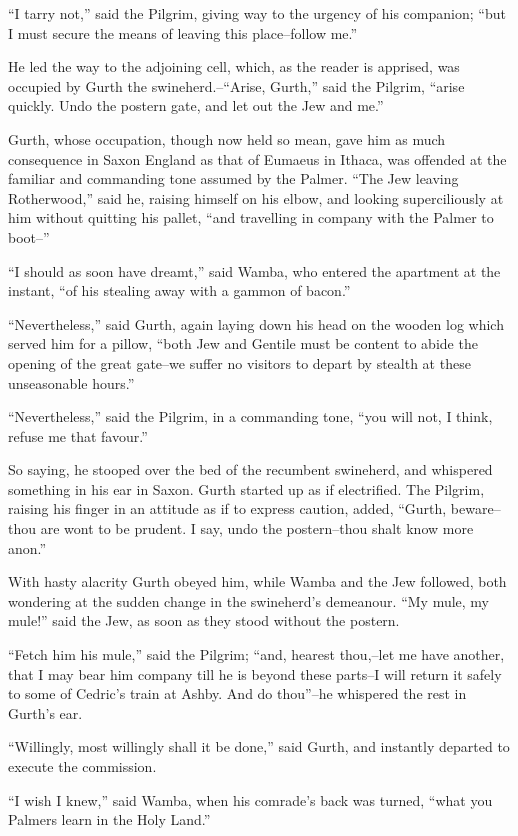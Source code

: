 ``I tarry not,'' said the Pilgrim, giving way to the urgency of his
companion; ``but I must secure the means of leaving this place--follow
me.''

He led the way to the adjoining cell, which, as the reader is apprised,
was occupied by Gurth the swineherd.--``Arise, Gurth,'' said the
Pilgrim, ``arise quickly. Undo the postern gate, and let out the Jew and
me.''

Gurth, whose occupation, though now held so mean, gave him as much
consequence in Saxon England as that of Eumaeus in Ithaca, was offended
at the familiar and commanding tone assumed by the Palmer. ``The Jew
leaving Rotherwood,'' said he, raising himself on his elbow, and looking
superciliously at him without quitting his pallet, ``and travelling in
company with the Palmer to boot--''

``I should as soon have dreamt,'' said Wamba, who entered the apartment
at the instant, ``of his stealing away with a gammon of bacon.''

``Nevertheless,'' said Gurth, again laying down his head on the wooden
log which served him for a pillow, ``both Jew and Gentile must be
content to abide the opening of the great gate--we suffer no visitors to
depart by stealth at these unseasonable hours.''

``Nevertheless,'' said the Pilgrim, in a commanding tone, ``you will
not, I think, refuse me that favour.''

So saying, he stooped over the bed of the recumbent swineherd, and
whispered something in his ear in Saxon. Gurth started up as if
electrified. The Pilgrim, raising his finger in an attitude as if to
express caution, added, ``Gurth, beware--thou are wont to be prudent. I
say, undo the postern--thou shalt know more anon.''

With hasty alacrity Gurth obeyed him, while Wamba and the Jew followed,
both wondering at the sudden change in the swineherd's demeanour. ``My
mule, my mule!'' said the Jew, as soon as they stood without the
postern.

``Fetch him his mule,'' said the Pilgrim; ``and, hearest thou,--let me
have another, that I may bear him company till he is beyond these
parts--I will return it safely to some of Cedric's train at Ashby. And
do thou''--he whispered the rest in Gurth's ear.

``Willingly, most willingly shall it be done,'' said Gurth, and
instantly departed to execute the commission.

``I wish I knew,'' said Wamba, when his comrade's back was turned,
``what you Palmers learn in the Holy Land.''

